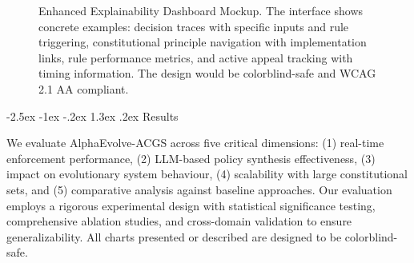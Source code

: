 \documentclass[manuscript,screen,review,anonymous,9pt]{acmart}
\makeatletter
\renewcommand\section{\@startsection{section}{1}{\z@}%
  {-2.5ex \@plus -1ex \@minus -.2ex}%
  {1.3ex \@plus.2ex}%
  {\normalfont\Large\bfseries}}
\makeatother
\begin{document}
\begin{figure}[htbp]
	\centering
	\caption[Enhanced explainability dashboard mockup]{Enhanced Explainability Dashboard Mockup. The interface shows concrete examples: decision traces with specific inputs and rule triggering, constitutional principle navigation with implementation links, rule performance metrics, and active appeal tracking with timing information. The design would be colorblind-safe and WCAG 2.1 AA compliant.}
	\label{fig:explainability_dashboard}
\end{figure}

\section{Results}
\label{sec:results}

We evaluate AlphaEvolve-ACGS across five critical dimensions: (1) real-time enforcement performance, (2) LLM-based policy synthesis effectiveness, (3) impact on evolutionary system behaviour, (4) scalability with large constitutional sets, and (5) comparative analysis against baseline approaches. Our evaluation employs a rigorous experimental design with statistical significance testing, comprehensive ablation studies, and cross-domain validation to ensure generalizability. All charts presented or described are designed to be colorblind-safe.
\end{document}
